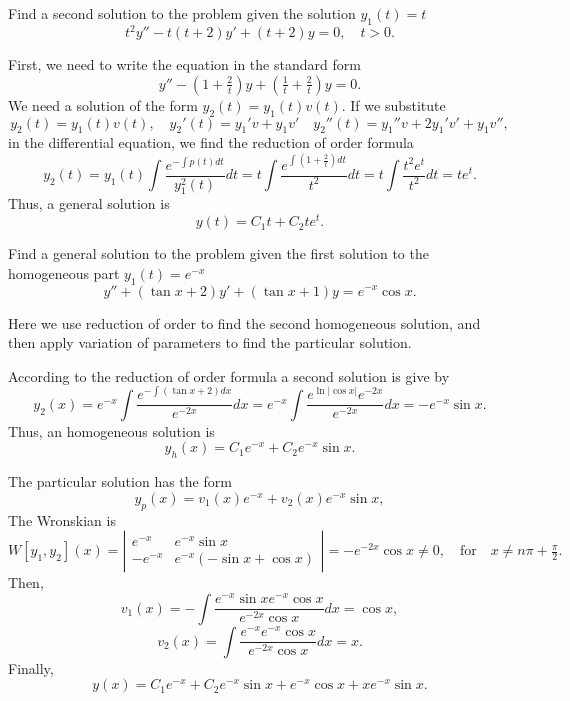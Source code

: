 \documentclass[11pt]{article}
\begin{document}
\begin{problem}
Find a second solution to the problem given the solution $y_{1}(t)=t$
\begin{equation*}
t^{2}y''-t(t+2)y'+(t+2)y=0, \quad t>0.
\end{equation*}
\end{problem}
\begin{solution}
First, we need to write the equation in the standard form
\[y''-\left( 1 + \tfrac{2}{t} \right) y + \left(\tfrac{1}{t} + \tfrac{2}{t}\right) y=0.\]
We need a solution of the form $y_{2}(t)=y_{1}(t)v(t)$. If we substitute 
$$y_{2}(t)=y_{1}(t)v(t), \quad y_{2}'(t)=y_{1}'v + y_{1}v' \quad y_{2}''(t)=y_{1}''v + 2y_{1}'v'+ y_{1}v'',$$
in the differential equation, we find the reduction of order formula 
\[y_{2}(t)=y_{1}(t)\int \frac{e^{-\int p(t)dt}}{y_{1}^{2}(t)}dt = t\int \frac{e^{\int \left( 1 + \tfrac{2}{t} \right)dt}}{t^2}dt= t\int \frac{t^2e^{t}}{t^2}dt=te^{t}.\]
Thus, a general solution is 
\[\boxed{y(t) = C_{1}t + C_{2}te^{t}}.\]
\end{solution}



\begin{problem}
Find a general solution to the problem given the first solution to the homogeneous part $y_{1}(t)=e^{-x}$
\begin{equation*}
y''+(\tan x +2)y'+(\tan x+1)y=e^{-x}\cos x.
\end{equation*}
\end{problem}
\begin{solution}
Here we use reduction of order to find the second homogeneous solution, and then apply variation of parameters to find the particular solution.

According to the reduction of order formula a second solution is give by
\begin{equation*}
y_{2}(x)=e^{-x}\int \frac{e^{-\int(\tan x + 2)dx}}{e^{-2x}}dx = e^{-x}\int \frac{e^{\ln|\cos x|}e^{-2x}}{e^{-2x}}dx=-e^{-x}\sin x.
\end{equation*}
Thus, an homogeneous solution is
\[y_{h}(x)=C_{1}e^{-x}+C_{2}e^{-x}\sin x.\]

The particular solution has the form
\[y_{p}(x)=v_{1}(x)e^{-x}+v_{2}(x)e^{-x}\sin x,\]
The Wronskian is
\begin{equation*}
W[y_{1},y_{2}](x) = \left| \begin{array}{cc} e^{-x} & e^{-x}\sin x \\
-e^{-x} & e^{-x}(-\sin x +\cos x) \end{array} \right| = -e^{-2x}\cos x \neq 0, \quad \text{for} \quad x \neq n\pi +\tfrac{\pi}{2}.
\end{equation*}
Then,
\begin{equation*}
v_{1}(x) = - \int \dfrac{e^{-x}\sin x e^{-x}\cos x}{e^{-2x}\cos x}dx =\cos x,
\end{equation*}
\begin{equation*}
v_{2}(x) =  \int \dfrac{e^{-x} e^{-x}\cos x}{e^{-2x}\cos x}dx =x.
\end{equation*}
Finally,
\[\boxed{y(x)=C_{1}e^{-x}+C_{2}e^{-x}\sin x + e^{-x}\cos x  + xe^{-x}\sin x.}\]
\end{solution}
% 
\end{document}
